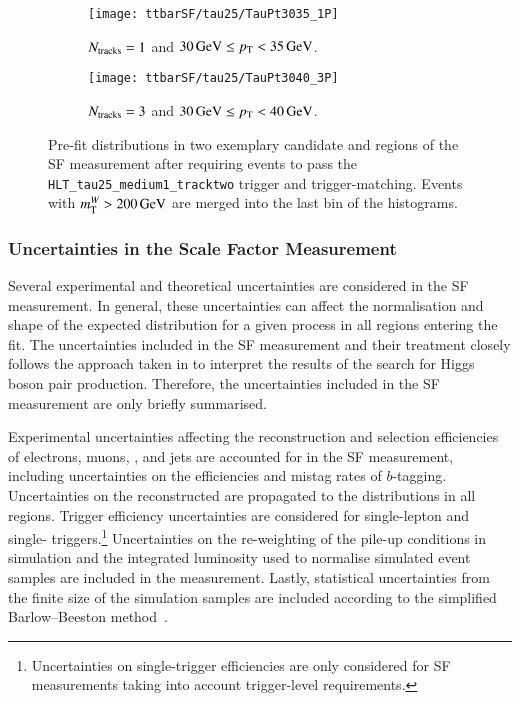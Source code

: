 \begin{figure}[htbp]
  \centering

  \begin{subfigure}{.48\textwidth}
    \texttt{[image: ttbarSF/tau25/TauPt3035\_1P]}
    \caption{$N_{\text{tracks}} = 1$ and $\SI{30}{\ensuremath{\text{GeV}}} \leq p_{\text{T}} < \SI{35}{\ensuremath{\text{GeV}}}$.}
  \end{subfigure}\hfill%
  \begin{subfigure}{.48\textwidth}
    \texttt{[image: ttbarSF/tau25/TauPt3040\_3P]}
    \caption{$N_{\text{tracks}} = 3$ and $\SI{30}{\GeV} \leq \pT < \SI{40}{\GeV}$.}
  \end{subfigure}

  \caption{Pre-fit \mTW distributions in two exemplary \tauhadvis candidate
    \Ntracks and \pT regions of the SF measurement after requiring events to
    pass the \texttt{HLT\_tau25\_medium1\_tracktwo} trigger and
    trigger-matching. Events with $m_{\text{T}}^W > \SI{200}{\ensuremath{\text{GeV}}}$ are merged into the
    last bin of the histograms.}%
  \label{fig:ttbarsf_mtw_examples_prefit}
\end{figure}


\subsubsection{Uncertainties in the Scale Factor Measurement}

Several experimental and theoretical uncertainties are considered in the SF
measurement. In general, these uncertainties can affect the normalisation and
shape of the expected \mTW distribution for a given process in all regions
entering the fit. The uncertainties included in the SF measurement and their
treatment closely follows the approach taken in
 to interpret the results of
the search for Higgs boson pair production. Therefore, the uncertainties
included in the SF measurement are only briefly summarised.

Experimental uncertainties affecting the reconstruction and selection
efficiencies of electrons, muons, \tauhadvis, and jets are accounted for in the
SF measurement, including uncertainties on the efficiencies and mistag rates of
$b$-tagging. Uncertainties on the reconstructed \pTmissAbs are propagated to the
\mTW distributions in all regions. Trigger efficiency uncertainties are
considered for single-lepton and single-\tauhadvis
triggers.\footnote{Uncertainties on single-\tauhadvis trigger efficiencies are
  only considered for SF measurements taking into account trigger-level \tauid
  requirements.}  Uncertainties on the re-weighting of the pile-up conditions in
simulation and the integrated luminosity used to normalise simulated event
samples are included in the measurement. Lastly, statistical uncertainties from
the finite size of the simulation samples are included according to the
simplified Barlow--Beeston method~\cite{barlow1993,conway2011}.

